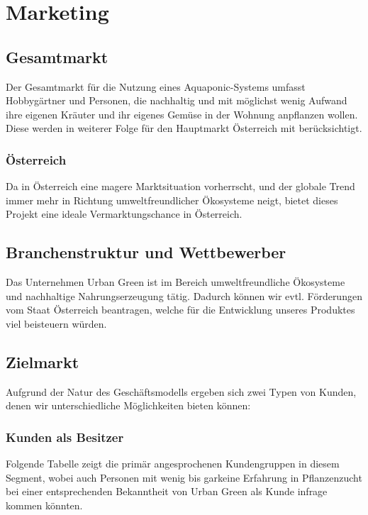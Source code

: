 \documentclass[11pt]{article}
\begin{document}
\section{Marketing}
\subsection{Gesamtmarkt}

Der Gesamtmarkt f\"ur die Nutzung eines Aquaponic-Systems umfasst Hobbyg\"artner und Personen, die nachhaltig und mit m\"oglichst wenig Aufwand ihre eigenen Kr\"auter und ihr eigenes Gem\"use in der Wohnung anpflanzen wollen. Diese werden in weiterer Folge f\"ur den Hauptmarkt \"Osterreich mit ber\"ucksichtigt.

\subsubsection{\"Osterreich}

Da in \"Osterreich eine magere Marktsituation vorherrscht, und der globale Trend immer mehr in Richtung umweltfreundlicher \"Okosysteme neigt, bietet dieses Projekt eine ideale Vermarktungschance in \"Osterreich.

\subsection{Branchenstruktur und Wettbewerber}

Das Unternehmen Urban Green ist im Bereich umweltfreundliche \"Okosysteme und nachhaltige Nahrungserzeugung t\"atig. Dadurch können wir evtl. Förderungen vom Staat Österreich beantragen, welche für die Entwicklung unseres Produktes viel beisteuern würden.

\subsection{Zielmarkt}

Aufgrund der Natur des Gesch\"aftsmodells ergeben sich zwei Typen von Kunden, denen wir unterschiedliche M\"oglichkeiten bieten k\"onnen:

\clearpage

\subsubsection{Kunden als Besitzer}

Folgende Tabelle zeigt die prim\"ar angesprochenen Kundengruppen in diesem Segment, wobei auch Personen mit wenig bis garkeine Erfahrung in Pflanzenzucht bei einer entsprechenden Bekanntheit von Urban Green als Kunde infrage kommen k\"onnten.
\end{document}
